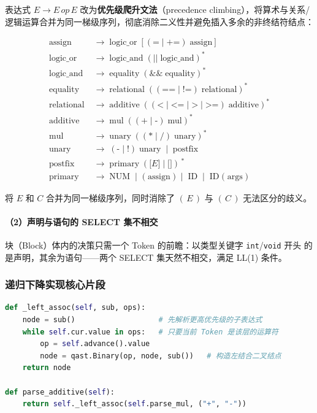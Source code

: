 \documentclass[12pt,a4paper]{ctexart}
\begin{document}
表达式 $E \to E\,\mathit{op}\,E$ 改为\textbf{优先级爬升文法}（precedence climbing），将算术与关系/逻辑运算合并为同一梯级序列，彻底消除二义性并避免插入多余的非终结符结点：

\begin{align*}
\text{assign}   &\;\to\; \text{logic\_or}\;[(\texttt{=}\mid\texttt{+=})\;\text{assign}] \\
\text{logic\_or}  &\;\to\; \text{logic\_and}\;(\texttt{||}\;\text{logic\_and})^* \\
\text{logic\_and} &\;\to\; \text{equality}\;(\texttt{\&\&}\;\text{equality})^* \\
\text{equality}   &\;\to\; \text{relational}\;((\texttt{==}\mid\texttt{!=})\;\text{relational})^* \\
\text{relational} &\;\to\; \text{additive}\;((\texttt{<}\mid\texttt{<=}\mid\texttt{>}\mid\texttt{>=})\;\text{additive})^* \\
\text{additive}   &\;\to\; \text{mul}\;((\texttt{+}\mid\texttt{-})\;\text{mul})^* \\
\text{mul}        &\;\to\; \text{unary}\;((\texttt{*}\mid\texttt{/})\;\text{unary})^* \\
\text{unary}      &\;\to\; (\texttt{-}\mid\texttt{!})\;\text{unary}\;\mid\;\text{postfix} \\
\text{postfix}    &\;\to\; \text{primary}\;(\texttt{[}E\texttt{]}\mid\texttt{[}\texttt{]})\,^* \\
\text{primary}    &\;\to\; \text{NUM}\;\mid\;\texttt{(}\;\text{assign}\;\texttt{)}\;\mid\;\text{ID}\;\mid\;\text{ID}\;\texttt{(}\;\text{args}\;\texttt{)}
\end{align*}

将 $E$ 和 $C$ 合并为同一梯级序列，同时消除了 $(\,E\,)$ 与 $(\,C\,)$ 无法区分的歧义。

\paragraph{（2）声明与语句的 SELECT 集不相交}

块（Block）体内的决策只需一个 Token 的前瞻：以类型关键字 \texttt{int}/\texttt{void} 开头
的是声明，其余为语句——两个 SELECT 集天然不相交，满足 LL(1) 条件。

\subsubsection{递归下降实现核心片段}

\begin{lstlisting}[language=Python, caption={优先级爬升的通用左结合辅助函数}]
def _left_assoc(self, sub, ops):
    node = sub()                   # 先解析更高优先级的子表达式
    while self.cur.value in ops:   # 只要当前 Token 是该层的运算符
        op = self.advance().value
        node = qast.Binary(op, node, sub())   # 构造左结合二叉结点
    return node

def parse_additive(self):
    return self._left_assoc(self.parse_mul, ("+", "-"))
\end{lstlisting}
\end{document}
